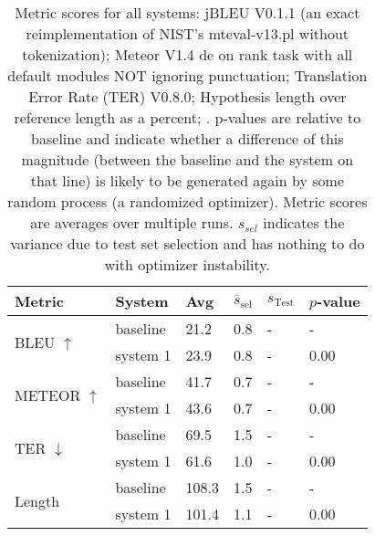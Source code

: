 \begin{table}[htb]
\begin{center}
\begin{footnotesize}
\begin{tabular}{|l|l|l|l|l|l|}
\hline
\bf Metric & \bf System & \bf Avg & \bf $\overline{s}_{\text{sel}}$ & \bf $s_{\text{Test}}$ & \bf $p$-value \\
\hline
\multirow{2}{*}{BLEU $\uparrow$}
& baseline & 21.2 & 0.8 & - & - \\
& system 1 & 23.9 & 0.8 & - & 0.00 \\
\hline
\multirow{2}{*}{METEOR $\uparrow$}
& baseline & 41.7 & 0.7 & - & - \\
& system 1 & 43.6 & 0.7 & - & 0.00 \\
\hline
\multirow{2}{*}{TER $\downarrow$}
& baseline & 69.5 & 1.5 & - & - \\
& system 1 & 61.6 & 1.0 & - & 0.00 \\
\hline
\multirow{2}{*}{Length }
& baseline & 108.3 & 1.5 & - & - \\
& system 1 & 101.4 & 1.1 & - & 0.00 \\
\hline
\end{tabular}
\end{footnotesize}
\end{center}
\caption{\label{tab:scores} Metric scores for all systems: jBLEU V0.1.1 (an exact reimplementation of NIST's mteval-v13.pl without tokenization); Meteor V1.4 de on rank task with all default modules NOT ignoring punctuation; Translation Error Rate (TER) V0.8.0; Hypothesis length over reference length as a percent; . p-values are relative to baseline and indicate whether a difference of this magnitude (between the baseline and the system on that line) is likely to be generated again by some random process (a randomized optimizer). Metric scores are averages over multiple runs. $s_{sel}$ indicates the variance due to test set selection and has nothing to do with optimizer instability.}
\end{table}
